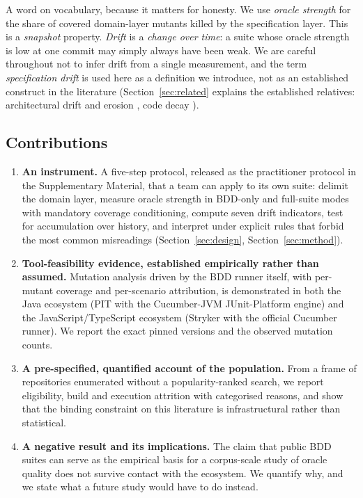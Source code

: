 A word on vocabulary, because it matters for honesty. We use \emph{oracle strength} for the share of
covered domain-layer mutants killed by the specification layer. This is a \emph{snapshot} property.
\emph{Drift} is a \emph{change over time}: a suite whose oracle strength is low at one commit may
simply always have been weak. We are careful throughout not to infer drift from a single measurement,
and the term \emph{specification drift} is used here as a definition we introduce, not as an
established construct in the literature (Section~\ref{sec:related} explains the established
relatives: architectural drift and erosion \citep{PerryWolf1992,Rosik2010ArchDrift}, code decay
\citep{Izurieta2012Decay}).

\subsection{Contributions}

\begin{enumerate}
\item \textbf{An instrument.} A five-step protocol, released as the practitioner protocol in the Supplementary Material, that a team can apply
      to its own suite: delimit the domain layer, measure oracle strength in BDD-only and full-suite
      modes with mandatory coverage conditioning, compute seven drift indicators, test for
      accumulation over history, and interpret under explicit rules that forbid the most common
      misreadings (Section~\ref{sec:design}, Section~\ref{sec:method}).
\item \textbf{Tool-feasibility evidence, established empirically rather than assumed.} Mutation
      analysis driven by the BDD runner itself, with per-mutant coverage and per-scenario
      attribution, is demonstrated in both the Java ecosystem (PIT with the Cucumber-JVM
      JUnit-Platform engine) and the JavaScript/TypeScript ecosystem (Stryker with the official
      Cucumber runner). We report the exact pinned versions and the observed mutation counts.
\item \textbf{A pre-specified, quantified account of the population.} From a frame of \Nframe{}
      repositories enumerated without a popularity-ranked search, we report eligibility, build and
      execution attrition with categorised reasons, and show that the binding constraint on this
      literature is infrastructural rather than statistical.
\item \textbf{A negative result and its implications.} The claim that public BDD suites can serve as
      the empirical basis for a corpus-scale study of oracle quality does not survive contact with
      the ecosystem. We quantify why, and we state what a future study would have to do instead.
\end{enumerate}

